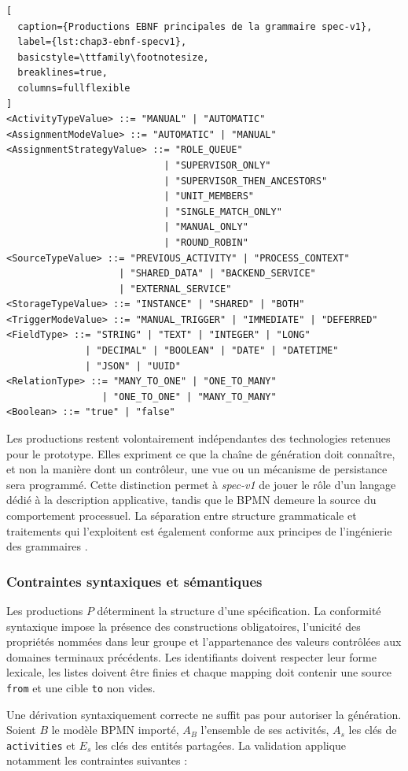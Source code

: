 \begin{lstlisting}[
  caption={Productions EBNF principales de la grammaire spec-v1},
  label={lst:chap3-ebnf-specv1},
  basicstyle=\ttfamily\footnotesize,
  breaklines=true,
  columns=fullflexible
]
<ActivityTypeValue> ::= "MANUAL" | "AUTOMATIC"
<AssignmentModeValue> ::= "AUTOMATIC" | "MANUAL"
<AssignmentStrategyValue> ::= "ROLE_QUEUE"
                            | "SUPERVISOR_ONLY"
                            | "SUPERVISOR_THEN_ANCESTORS"
                            | "UNIT_MEMBERS"
                            | "SINGLE_MATCH_ONLY"
                            | "MANUAL_ONLY"
                            | "ROUND_ROBIN"
<SourceTypeValue> ::= "PREVIOUS_ACTIVITY" | "PROCESS_CONTEXT"
                    | "SHARED_DATA" | "BACKEND_SERVICE"
                    | "EXTERNAL_SERVICE"
<StorageTypeValue> ::= "INSTANCE" | "SHARED" | "BOTH"
<TriggerModeValue> ::= "MANUAL_TRIGGER" | "IMMEDIATE" | "DEFERRED"
<FieldType> ::= "STRING" | "TEXT" | "INTEGER" | "LONG"
              | "DECIMAL" | "BOOLEAN" | "DATE" | "DATETIME"
              | "JSON" | "UUID"
<RelationType> ::= "MANY_TO_ONE" | "ONE_TO_MANY"
                 | "ONE_TO_ONE" | "MANY_TO_MANY"
<Boolean> ::= "true" | "false"
\end{lstlisting}

Les productions restent volontairement indépendantes des technologies retenues
pour le prototype. Elles expriment ce que la chaîne de génération doit connaître,
et non la manière dont un contrôleur, une vue ou un mécanisme de persistance sera
programmé. Cette distinction permet à \textit{spec-v1} de jouer le rôle d'un
langage dédié à la description applicative, tandis que le BPMN demeure la source
du comportement processuel. La séparation entre structure grammaticale et
traitements qui l'exploitent est également conforme aux principes de
l'ingénierie des grammaires \cite{klint2005toward}.

\subsubsection*{Contraintes syntaxiques et sémantiques}

Les productions $P$ déterminent la structure d'une spécification. La conformité
syntaxique impose la présence des constructions obligatoires, l'unicité des
propriétés nommées dans leur groupe et l'appartenance des valeurs contrôlées aux
domaines terminaux précédents. Les identifiants doivent respecter leur forme
lexicale, les listes doivent être finies et chaque mapping doit contenir une
source \texttt{from} et une cible \texttt{to} non vides.

Une dérivation syntaxiquement correcte ne suffit pas pour autoriser la
génération. Soient $B$ le modèle BPMN importé, $A_B$ l'ensemble de ses activités,
$A_s$ les clés de \texttt{activities} et $E_s$ les clés des entités partagées.
La validation applique notamment les contraintes suivantes :


